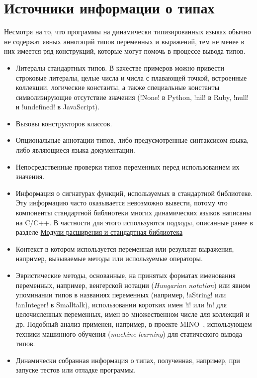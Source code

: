\section{Источники информации о типах}
\label{sec:type-sources}

Несмотря на то, что программы на динамически типизированных языках обычно не
содержат явных аннотаций типов переменных и выражений, тем не менее в них
имеется ряд конструкций, которые могут помочь в процессе вывода типов. 

\begin{itemize}
    \item{%
        Литералы стандартных типов. В качестве примеров можно привести
        строковые литералы, целые числа и числа с плавающей точкой, встроенные
        коллекции, логические константы, а также специальные константы символизирующие
        отсутствие значения (!None! в Python, !nil! в Ruby,
        !null! и !undefined! в JavaScript).
      }
    \item{%
        Вызовы конструкторов классов.
      }
    \item{%
        Опциональные аннотации типов, либо предусмотренные синтаксисом языка, либо
        являющиеся языка документации.
      }
    \item{%
        Непосредственные проверки типов переменных перед использованием их
        значения.
      }
    \item{%
        Информация о сигнатурах функций, используемых в стандартной
        библиотеке. Эту информацию часто оказывается невозможно вывести, потому
        что компоненты стандартной библиотеки многих
        динамических языков написаны на C/C++. В частности для этого
        используются подходы, описанные ранее в разделе
        \hyperref[sec:extensions-and-stdlib]{Модули расширения и стандартная библиотека}
      }
    \item{%
        Контекст в котором используется переменная или результат выражения, 
        например, вызываемые методы или используемые операторы.
      }
    \item{%
        Эвристические методы, основанные, на принятых форматах
        именования переменных, например, венгерской нотации (\emph{Hungarian
          notation}) или явном упоминании типов в названиях переменных (например,
        !aString! или !anInteger! в Smalltalk), использовании коротких имен !i! или !n!
        для целочисленных переменных, имен во множественном числе для коллекций
        и др. Подобный анализ применен, например, в проекте MINO~\cite[]{Tu},
        использующем техники машинного обучения (\emph{machine learning}) для
        статического вывода типов.
    }
    \item{%
      Динамически собранная информация о типах, полученная, например, при
      запуске тестов или отладке программы.
    }
\end{itemize}
     
